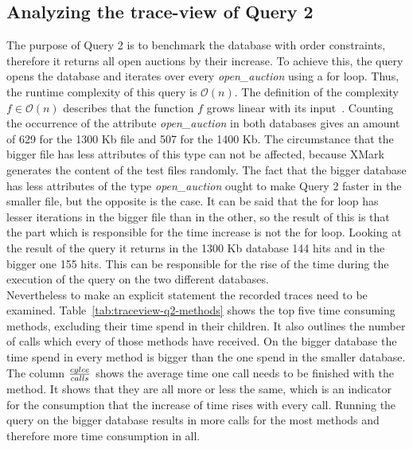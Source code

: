 \subsection*{Analyzing the trace-view of Query 2}
\label{sec:analyzing-the-trace-view-of-query-2}
The purpose of Query 2 is to benchmark the database with order constraints, therefore it returns all open auctions by their increase.
To achieve this, the query opens the database and iterates over every \textit{open\_auction} using a for loop.
Thus, the runtime complexity of this query is $\mathcal O(n)$.
The definition of the complexity $f \in \mathcal O(n)$ describes that the function $f$ grows linear with its input~\cite{knuth1976big}.
Counting the occurrence of the attribute \textit{open\_auction} in both databases gives an amount of 629 for the 1300 Kb file and 507 for the 1400 Kb.
The circumstance that the bigger file has less attributes of this type can not be affected, because XMark generates the content of the test files randomly.
The fact that the bigger database has less attributes of the type \textit{open\_auction} ought to make Query 2 faster in the smaller file, but the opposite is the case.
It can be said that the for loop has lesser iterations in the bigger file than in the other, so the result of this is that the part which is responsible for the time increase is not the for loop.
Looking at the result of the query it returns in the 1300 Kb database 144 hits and in the bigger one 155 hits.
This can be responsible for the rise of the time during the execution of the query on the two different databases.
\\
Nevertheless to make an explicit statement the recorded traces need to be examined.
Table~\ref{tab:traceview-q2-methods} shows the top five time consuming methods, excluding their time spend in their children.
It also outlines the number of calls which every of those methods have received.
On the bigger database the time spend in every method is bigger than the one spend in the smaller database.
The column \textit{${cylce \over calls}$} shows the average time one call needs to be finished with the method.
It shows that they are all more or less the same, which is an indicator for the consumption that the increase of time rises with every call.
Running the query on the bigger database results in more calls for the most methods and therefore more time consumption in all.
